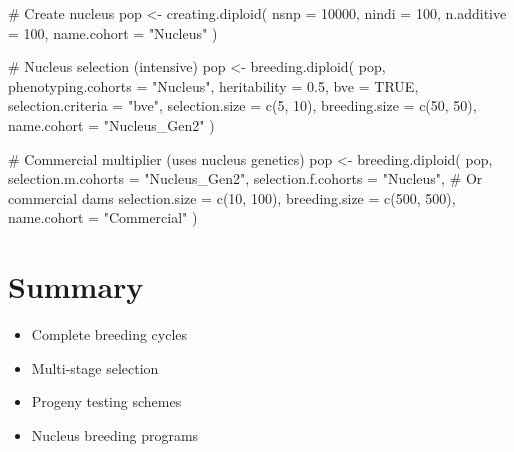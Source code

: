 \documentclass[
  letterpaper,
]{book}
\newenvironment{Shaded}{\begin{snugshade}}{\end{snugshade}}
\newcommand{\AttributeTok}[1]{\textcolor[rgb]{0.40,0.45,0.13}{#1}}
\newcommand{\CommentTok}[1]{\textcolor[rgb]{0.37,0.37,0.37}{#1}}
\newcommand{\ConstantTok}[1]{\textcolor[rgb]{0.56,0.35,0.01}{#1}}
\newcommand{\DecValTok}[1]{\textcolor[rgb]{0.68,0.00,0.00}{#1}}
\newcommand{\FloatTok}[1]{\textcolor[rgb]{0.68,0.00,0.00}{#1}}
\newcommand{\FunctionTok}[1]{\textcolor[rgb]{0.28,0.35,0.67}{#1}}
\newcommand{\NormalTok}[1]{\textcolor[rgb]{0.00,0.23,0.31}{#1}}
\newcommand{\OtherTok}[1]{\textcolor[rgb]{0.00,0.23,0.31}{#1}}
\newcommand{\StringTok}[1]{\textcolor[rgb]{0.13,0.47,0.30}{#1}}
\providecommand{\tightlist}{%
  \setlength{\itemsep}{0pt}\setlength{\parskip}{0pt}}
\begin{document}
\begin{Shaded}
\begin{Highlighting}[]
\CommentTok{\# Create nucleus}
\NormalTok{pop }\OtherTok{\textless{}{-}} \FunctionTok{creating.diploid}\NormalTok{(}
  \AttributeTok{nsnp =} \DecValTok{10000}\NormalTok{, }\AttributeTok{nindi =} \DecValTok{100}\NormalTok{,}
  \AttributeTok{n.additive =} \DecValTok{100}\NormalTok{,}
  \AttributeTok{name.cohort =} \StringTok{"Nucleus"}
\NormalTok{)}

\CommentTok{\# Nucleus selection (intensive)}
\NormalTok{pop }\OtherTok{\textless{}{-}} \FunctionTok{breeding.diploid}\NormalTok{(}
\NormalTok{  pop,}
  \AttributeTok{phenotyping.cohorts =} \StringTok{"Nucleus"}\NormalTok{,}
  \AttributeTok{heritability =} \FloatTok{0.5}\NormalTok{,}
  \AttributeTok{bve =} \ConstantTok{TRUE}\NormalTok{,}
  \AttributeTok{selection.criteria =} \StringTok{"bve"}\NormalTok{,}
  \AttributeTok{selection.size =} \FunctionTok{c}\NormalTok{(}\DecValTok{5}\NormalTok{, }\DecValTok{10}\NormalTok{),}
  \AttributeTok{breeding.size =} \FunctionTok{c}\NormalTok{(}\DecValTok{50}\NormalTok{, }\DecValTok{50}\NormalTok{),}
  \AttributeTok{name.cohort =} \StringTok{"Nucleus\_Gen2"}
\NormalTok{)}

\CommentTok{\# Commercial multiplier (uses nucleus genetics)}
\NormalTok{pop }\OtherTok{\textless{}{-}} \FunctionTok{breeding.diploid}\NormalTok{(}
\NormalTok{  pop,}
  \AttributeTok{selection.m.cohorts =} \StringTok{"Nucleus\_Gen2"}\NormalTok{,}
  \AttributeTok{selection.f.cohorts =} \StringTok{"Nucleus"}\NormalTok{,    }\CommentTok{\# Or commercial dams}
  \AttributeTok{selection.size =} \FunctionTok{c}\NormalTok{(}\DecValTok{10}\NormalTok{, }\DecValTok{100}\NormalTok{),}
  \AttributeTok{breeding.size =} \FunctionTok{c}\NormalTok{(}\DecValTok{500}\NormalTok{, }\DecValTok{500}\NormalTok{),}
  \AttributeTok{name.cohort =} \StringTok{"Commercial"}
\NormalTok{)}
\end{Highlighting}
\end{Shaded}

\section{Summary}\label{summary-9}

\begin{itemize}
\tightlist
\item
  Complete breeding cycles
\item
  Multi-stage selection
\item
  Progeny testing schemes
\item
  Nucleus breeding programs
\end{itemize}
\end{document}
